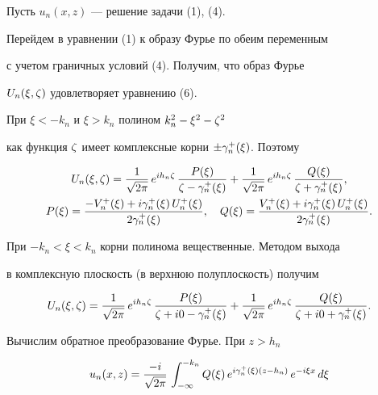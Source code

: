 \begin{pf}


Пусть $u_n(x,z)$ --- решение задачи (1), (4).


Перейдем в уравнении (1) к образу Фурье по обеим переменным


с учетом граничных условий (4). Получим, что образ Фурье


$U_n(\xi,\zeta)$ удовлетворяет уравнению (6).





При $\xi<-k_n$ и $\xi>k_n$ полином $k_n^2-\xi^2-\zeta^2$


как функция $\zeta$ имеет комплексные корни $\pm\gamma_{n}^+(\xi)$. Поэтому


\begin{gather*}


U_n(\xi,\dz) =


\frac{1}{\sqrt{2\pi}}\,e^{ih_n\dz}\,\frac{P(\xi)}{\dz-\gaxi{n}}


+ \frac{1}{\sqrt{2\pi}}\,e^{ih_n\dz}\,\frac{Q(\xi)}{\dz+\gaxi{n}} ,\\


%


P(\xi) = \frac{-V^+_n(\xi)+i\gaxi{n}\,U^+_n(\xi)}{2\gaxi{n}},\quad


Q(\xi) = \frac{V^+_n(\xi)+i\gaxi{n}\,U^+_n(\xi)}{2\gaxi{n}} .


\end{gather*}


При $-k_n<\xi<k_n$ корни полинома вещественные. Методом выхода


в комплексную плоскость (в верхнюю полуплоскость) получим


$$


U_n(\xi,\dz) =


\frac{1}{\sqrt{2\pi}}\,e^{ih_n\dz}\,\frac{P(\xi)}{\dz+i0-\gaxi{n}}


+ \frac{1}{\sqrt{2\pi}}\,e^{ih_n\dz}\,\frac{Q(\xi)}{\dz+i0+\gaxi{n}} .


$$





Вычислим обратное преобразование Фурье. При $z>h_n$


\begin{multline}


u_n(x,z) =


\frac{-i}{\sqrt{2\pi}}\,\int_{-\infty}^{-k_n}


Q(\xi)\,e^{i\gaxi{n}(z-h_n)}\,e^{-i\xi x}\,d\xi



\end{multline}
\end{pf}
